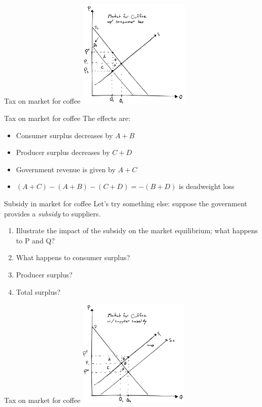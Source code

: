 \documentclass[aspectratio=169]{beamer}
\begin{document}
\begin{frame}{Tax on market for coffee}
    \centering
    \includegraphics[width = 0.4\textwidth,keepaspectratio]{../figs/coffee4.png}
\end{frame}

\begin{frame}{Tax on market for coffee}
    The effects are:
    \begin{itemize}
        \item Consumer surplus decreases by $A + B$
        \item Producer surplus decreases by $C + D$
        \item Government revenue is given by $A + C$
        \item $(A+C) - (A+B) - (C+D) = -(B + D)$ is deadweight loss
    \end{itemize}
\end{frame}

\begin{frame}{Subsidy in market for coffee}
    Let's try something else: suppose the government provides a \textit{subsidy} to suppliers.

    \vspace{2mm}

    \begin{enumerate}
        \item Illustrate the impact of the subsidy on the market equilibrium; what happens to P and Q?
        \item What happens to consumer surplus?
        \item Producer surplus?
        \item Total surplus?
    \end{enumerate}
\end{frame}

\begin{frame}{Tax on market for coffee}
    \centering
    \includegraphics[width = 0.4\textwidth,keepaspectratio]{../figs/coffee3.png}
\end{frame}
\end{document}
